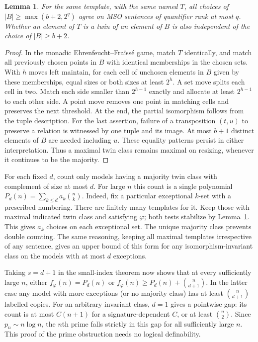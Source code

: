 \documentclass[11pt]{article}
\newtheorem{lemma}[theorem]{Lemma}
\begin{document}
\begin{lemma}\label{pump}
For the same template, with the same named $T$, all choices of $|B|\ge\max(b+2,2^q)$ agree on MSO sentences of quantifier rank at most $q$. Whether an element of $T$ is a twin of an element of $B$ is also independent of the choice of $|B|\ge b+2$.
\end{lemma}
\begin{proof}
In the monadic Ehrenfeucht--Fra\"iss\'e game, match $T$ identically, and match all previously chosen points in $B$ with identical memberships in the chosen sets. With $h$ moves left maintain, for each cell of unchosen elements in $B$ given by these memberships, equal sizes or both sizes at least $2^h$. A set move splits each cell in two. Match each side smaller than $2^{h-1}$ exactly and allocate at least $2^{h-1}$ to each other side. A point move removes one point in matching cells and preserves the next threshold. At the end, the partial isomorphism follows from the tuple description. For the last assertion, failure of a transposition $(t,u)$ to preserve a relation is witnessed by one tuple and its image. At most $b+1$ distinct elements of $B$ are needed including $u$. These equality patterns persist in either interpretation. Thus a maximal twin class remains maximal on resizing, whenever it continues to be the majority.
\end{proof}

For each fixed $d$, count only models having a majority twin class with complement of size at most $d$. For large $n$ this count is a single polynomial $P_d(n)=\sum_{k\le d}a_k\binom nk$. Indeed, fix a particular exceptional $k$-set with a prescribed numbering. There are finitely many templates for it. Keep those with maximal indicated twin class and satisfying $\varphi$; both tests stabilize by Lemma~\ref{pump}. This gives $a_k$ choices on each exceptional set. The unique majority class prevents double counting. The same reasoning, keeping all maximal templates irrespective of any sentence, gives an upper bound of this form for any isomorphism-invariant class on the models with at most $d$ exceptions.

Taking $s=d+1$ in the small-index theorem now shows that at every sufficiently large $n$, either $f_\varphi(n)=P_d(n)$ or $f_\varphi(n)\ge P_d(n)+\binom n{d+1}$. In the latter case any model with more exceptions (or no majority class) has at least $\binom n{d+1}$ labelled copies. For an arbitrary invariant class, $d=1$ gives a pointwise gap: its count is at most $C(n+1)$ for a signature-dependent $C$, or at least $\binom n2$. Since $p_n\sim n\log n$, the $n$th prime falls strictly in this gap for all sufficiently large $n$. This proof of the prime obstruction needs no logical definability.
\end{document}
